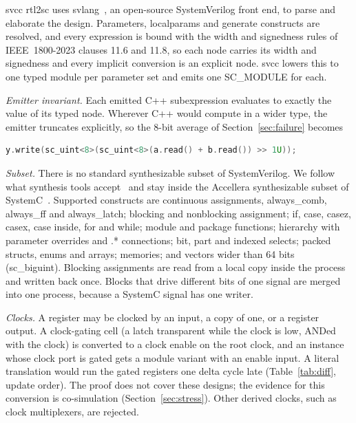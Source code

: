 \documentclass{ieeeaccess}
\newcommand{\code}[1]{{\fontshape{n}\ttfamily #1}}
\begin{document}
\code{svcc rtl2sc} uses \code{svlang}~\cite{kubavat2026svlang}, an open-source SystemVerilog front
end, to parse and elaborate the design. Parameters, \code{localparam}s and generate constructs are
resolved, and every expression is bound with the width and signedness rules of IEEE~1800-2023
clauses 11.6 and 11.8, so each node carries its width and signedness and every implicit
conversion is an explicit node. \code{svcc} lowers this to one typed module per parameter set and
emits one \code{SC\_MODULE} for each.

\emph{Emitter invariant.} Each emitted C++ subexpression evaluates to exactly the value of its
typed node. Wherever C++ would compute in a wider type, the emitter truncates explicitly, so the
8-bit average of Section~\ref{sec:failure} becomes
\begin{lstlisting}[language=C++]
y.write(sc_uint<8>(sc_uint<8>(a.read() + b.read()) >> 1U));
\end{lstlisting}

\emph{Subset.} There is no standard synthesizable subset of SystemVerilog. We follow what
synthesis tools accept~\cite{sutherland2014synth} and stay inside the Accellera synthesizable
subset of SystemC~\cite{ieee1666_1_2016}. Supported constructs are continuous assignments,
\code{always\_comb}, \code{always\_ff} and \code{always\_latch}; blocking and nonblocking
assignment; \code{if}, \code{case}, \code{casez}, \code{casex}, \code{case inside}, \code{for} and
\code{while}; module and package functions; hierarchy with parameter overrides and \code{.*}
connections; bit, part and indexed selects; packed structs, enums and arrays; memories; and vectors
wider than 64 bits (\code{sc\_biguint}). Blocking assignments are read from a local copy inside the
process and written back once. Blocks that drive different bits of one signal are merged into one
process, because a SystemC signal has one writer.

\emph{Clocks.} A register may be clocked by an input, a copy of one, or a register output. A
clock-gating cell (a latch transparent while the clock is low, ANDed with the clock) is converted
to a clock enable on the root clock, and an instance whose clock port is gated gets a module variant
with an enable input. A literal translation would run the gated registers one delta cycle late
(Table~\ref{tab:diff}, update order). The proof does not cover these designs; the evidence for
this conversion is co-simulation (Section~\ref{sec:stress}). Other derived clocks, such as clock
multiplexers, are rejected.
\end{document}
